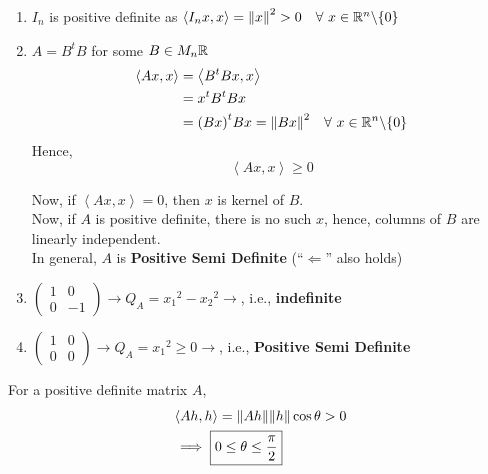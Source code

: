\documentclass[../Analysis-3.tex]{subfiles}
\begin{document}
\begin{Eg}{}{}
  \begin{enumerate}
    \item  $I_n$ is positive definite as $\left\langle I_nx, x \right\rangle = {\|x \|}^2 > 0 \quad \forall\ x \in \mathbb{R}^n \backslash \{0\}$
    \item $A = B^tB$ for some $B \in M_n{\mathbb{R}}$
          \begin{align*}
            \left\langle Ax,x \right\rangle & = \left\langle B^tBx,x \right\rangle                                    \\
                                            & = x^tB^tBx                                                              \\
                                            & = {(Bx)}^t Bx = {\| Bx \|}^2 \quad \forall\ x \in \mathbb{R}^n \backslash \{0\}
          \end{align*}
          Hence, \[ \left\langle Ax,x \right\rangle \geq 0 \]

          Now, if $ \left\langle Ax,x \right\rangle = 0 $, then  $x$ is kernel of $B$. \\
          Now, if $A$ is positive definite, there is no such $x$, hence, columns of $B$ are linearly independent. \\
          In general, $A$ is \textbf{Positive Semi Definite} (``$\Longleftarrow$'' also holds)

    \item $\begin{pmatrix}
              1 & 0  \\
              0 & -1
            \end{pmatrix} \longrightarrow Q_A = {x_1}^2 - {x_2}^2 \longrightarrow $, i.e., \textbf{indefinite}
    \item  $\begin{pmatrix}
              1 & 0 \\
              0 & 0
            \end{pmatrix} \longrightarrow Q_A = {x_1}^2 \geq 0 \longrightarrow $, i.e., \textbf{Positive Semi Definite}

  \end{enumerate}
\end{Eg}

For a positive definite matrix $ A $,
\begin{align*}
   & \left\langle Ah, h \right\rangle = \norm{Ah}\norm{h}\cos{\theta} > 0 \\
   & \implies \boxed{0 \leq \theta \leq \frac{\pi}{2}}
\end{align*}
\end{document}
